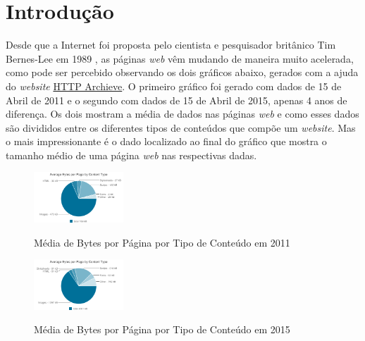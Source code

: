 %
%

\chapter{Introdução}\label{chap:introducao}

Desde que a Internet foi proposta pelo cientista e pesquisador britânico Tim Bernes-Lee em 1989 \cite{WebHistory}, as páginas \textit{web} vêm mudando de maneira muito acelerada, como pode ser percebido observando os dois gráficos abaixo, gerados com a ajuda do \textit{website} \href{http://httparchive.org/}{HTTP Archieve}. O primeiro gráfico foi gerado com dados de 15 de Abril de 2011 e o segundo com dados de 15 de Abril de 2015, apenas 4 anos de diferença. Os dois mostram a média de dados nas páginas \textit{web} e como esses dados são divididos entre os diferentes tipos de conteúdos que compõe um \textit{website}. Mas o mais impressionante é o dado localizado ao final do gráfico que mostra o tamanho médio de uma página \textit{web} nas respectivas dadas.

\begin{figure}[!htb]
    \centering
    \caption{Média de Bytes por Página por Tipo de Conteúdo em 2011}
    \includegraphics[width=0.3\textwidth]{./04-figuras/introducao/bytes_content_type_april_2011}
    \label{fig:httpcontenttype2011}
\end{figure}

\begin{figure}[!htb]
    \centering
    \caption{Média de Bytes por Página por Tipo de Conteúdo em 2015}
    \includegraphics[width=0.3\textwidth]{./04-figuras/introducao/bytes_content_type_april_2015}
    \label{fig:httpcontenttype2015}
\end{figure}

